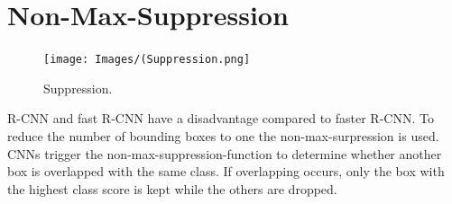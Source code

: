 \documentclass[a4paper,13pt,twoside]{book}
\begin{document}
\section{Non-Max-Suppression}

\begin{figure}[H]
  \texttt{[image: Images/(Suppression.png]}
  \caption{Suppression.}
  \label{fig:Suppression}
\end{figure}

R-CNN and fast R-CNN have a disadvantage compared to faster R-CNN. To reduce the number of bounding boxes to one the non-max-surpression is used. CNNs trigger the non-max-suppression-function to determine whether another box is overlapped with the same class. If overlapping occurs, only the box with the highest class score is kept while the others are dropped.
\end{document}
